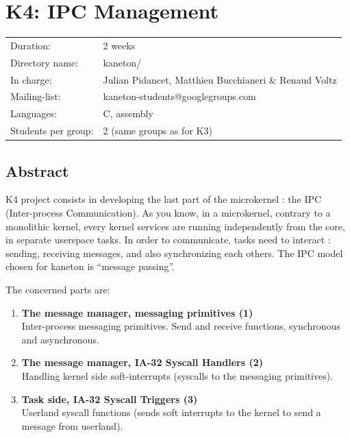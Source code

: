 
%
%

\chapter{K4: IPC Management}

%
%

\begin{tabular}{p{7cm}l}
Duration: & 2 weeks \\
Directory name: & kaneton/ \\
In charge: & Julian Pidancet, Matthieu Bucchianeri \& Renaud Voltz\\
Mailing-list: & kaneton-students@googlegroups.com \\
Languages: & C, assembly \\
Students per group: & 2 (same groups as for K3) \\
\end{tabular}

\section{Abstract}

K4 project consists in developing the last part of the microkernel :
the IPC (Inter-process Communication). As you know, in a microkernel,
contrary to a monolithic kernel, every kernel services are running
independently from the core, in separate userspace tasks. In order to
communicate, tasks need to interact : sending, receiving messages, and
also synchronizing each others. The IPC model chosen for kaneton is
``message passing''.

The concerned parts are:

\begin{enumerate}
  \item
    {\bf The message manager, messaging primitives (1)} \\
    Inter-process messaging primitives. Send and receive functions,
    synchronous and asynchronous.
  \item
    {\bf The message manager, IA-32 Syscall Handlers (2)}\\
    Handling kernel side soft-interrupts (syscalls to the messaging
    primitives).
  \item
    {\bf Task side, IA-32 Syscall Triggers (3)}\\
    Userland syscall functions (sends soft interrupts to the kernel to
    send a message from userland).
\end{enumerate}

